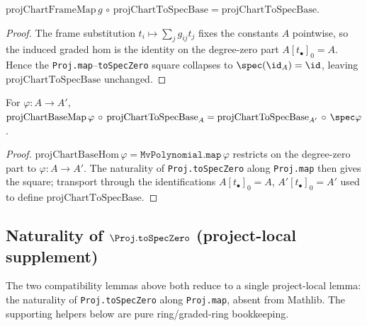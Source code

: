 \begin{lemma}

  \label{lem:projchart-frame-map-tospecbase}
  $\mathrm{projChartFrameMap}\,g\,\circ\,\mathrm{projChartToSpecBase}
  =\mathrm{projChartToSpecBase}$.
\end{lemma}
\begin{proof}
  The frame substitution $t_i\mapsto\sum_j g_{ij}t_j$ fixes the constants $A$
  pointwise, so the induced graded hom is the identity on the degree-zero part
  $A[t_\bullet]_0=A$. Hence the \texttt{Proj.map}--\texttt{toSpecZero} square
  collapses to $\spec(\id_A)=\id$, leaving $\mathrm{projChartToSpecBase}$ unchanged.
\end{proof}

\begin{lemma}

  \label{lem:projchart-base-map-tospecbase}
  For $\varphi:A\to A'$,
  $\mathrm{projChartBaseMap}\,\varphi\,\circ\,\mathrm{projChartToSpecBase}_A
  =\mathrm{projChartToSpecBase}_{A'}\,\circ\,\spec\varphi$.
\end{lemma}
\begin{proof}
  $\mathrm{projChartBaseHom}\,\varphi=\mathtt{MvPolynomial.map}\,\varphi$ restricts
  on the degree-zero part to $\varphi:A\to A'$. The naturality of
  \texttt{Proj.toSpecZero} along \texttt{Proj.map} then gives the square; transport
  through the identifications $A[t_\bullet]_0=A$, $A'[t_\bullet]_0=A'$ used to define
  $\mathrm{projChartToSpecBase}$.
\end{proof}

\subsection{Naturality of \texorpdfstring{$\Proj.\mathtt{toSpecZero}$}{Proj.toSpecZero} (project-local supplement)}

The two compatibility lemmas above both reduce to a single project-local lemma:
the naturality of \texttt{Proj.toSpecZero} along \texttt{Proj.map}, absent from
Mathlib. The supporting helpers below are pure ring/graded-ring bookkeeping.

